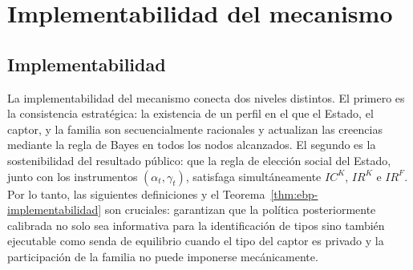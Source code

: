 \documentclass[review,authoryear,12pt]{elsarticle}
\theoremstyle{plain}
\theoremstyle{definition}
\newcommand{\1}{\mathbf{1}}
\begin{document}
\section{Implementabilidad del mecanismo}\label{sec:implementabilidad}

\subsection{Implementabilidad}\label{subsec:implementabilidad}

\noindent La implementabilidad del mecanismo conecta dos niveles distintos. El primero es la consistencia estratégica: la existencia de un perfil en el que el Estado, el captor, y la familia son secuencialmente racionales y actualizan las creencias mediante la regla de Bayes en todos los nodos alcanzados. El segundo es la sostenibilidad del resultado público: que la regla de elección social del Estado, junto con los instrumentos $(\alpha_t,\gamma_t)$, satisfaga simultáneamente $IC^K$, $IR^K$ e $IR^F$. Por lo tanto, las siguientes definiciones y el Teorema~\ref{thm:ebp-implementabilidad} son cruciales: garantizan que la política posteriormente calibrada no solo sea informativa para la identificación de tipos sino también ejecutable como senda de equilibrio cuando el tipo del captor es privado y la participación de la familia no puede imponerse mecánicamente.
\end{document}
